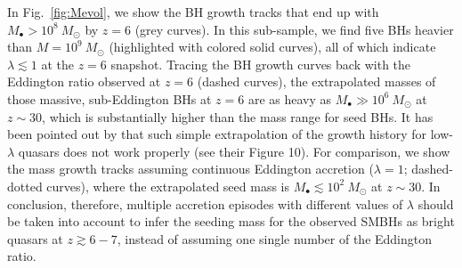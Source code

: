 \documentclass[twocolumn, twocolappendix]{aastex63}
\newcommand{\Msun}{M_\odot}
\newcommand{\Mbh}{M_\bullet}
\newcommand{\red}[1]{\textcolor{red}{ #1}}
\newcommand{\blue}[1]{\textcolor{blue}{ #1}}
\begin{document}
\begin{CJK*}{UTF8}{gbsn}
In Fig.~\ref{fig:Mevol}, we show the BH growth tracks that end up with $M_\bullet>10^8~\Msun$ by $z=6$ (grey curves).
In this sub-sample, we find five BHs heavier than $M=10^9~\Msun$ (highlighted with colored solid curves),
all of which indicate $\lambda \lesssim 1$ at the  $z=6$ snapshot.
Tracing the BH growth curves back with the Eddington ratio observed at $z=6$ (dashed curves),
the extrapolated masses of those massive, sub-Eddington BHs at $z=6$ are as heavy as $\Mbh \gg 10^6~\Msun$ at $z\sim 30$,
which is substantially higher than the mass range for seed BHs.
%
It has been pointed out by \cite{2019ApJ...880...77O} that such simple extrapolation of the growth history for low-$\lambda$ quasars 
does not work properly (see their Figure 10).
For comparison, we show the mass growth tracks assuming continuous Eddington accretion ($\lambda=1$; dashed-dotted curves),
where the extrapolated seed mass is $\Mbh \lesssim 10^2~\Msun$ at $z\sim 30$.
In conclusion, therefore, multiple accretion episodes with different values of $\lambda$ should be taken into account 
to infer the seeding mass for the observed SMBHs as bright quasars at $z\gtrsim 6-7$,
instead of assuming one single number of the Eddington ratio.





\end{CJK*}
\end{document}

